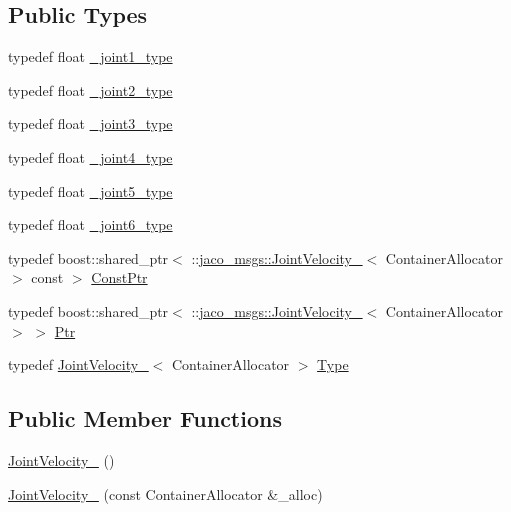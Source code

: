 \subsection*{Public Types}
\begin{DoxyCompactItemize}
\item 
typedef float \hyperlink{structjaco__msgs_1_1JointVelocity___ab6a0b6d8bf7015aff3a61c25b4bdf67b}{\+\_\+joint1\+\_\+type}
\item 
typedef float \hyperlink{structjaco__msgs_1_1JointVelocity___a60a2a12b126edac2c3004568aa77f833}{\+\_\+joint2\+\_\+type}
\item 
typedef float \hyperlink{structjaco__msgs_1_1JointVelocity___a516b16873309e426015d059948c9de5f}{\+\_\+joint3\+\_\+type}
\item 
typedef float \hyperlink{structjaco__msgs_1_1JointVelocity___a5433af2aa782711e694f2dea934d1e8a}{\+\_\+joint4\+\_\+type}
\item 
typedef float \hyperlink{structjaco__msgs_1_1JointVelocity___a994fb0216a13a4bac0b44d75b293c8d1}{\+\_\+joint5\+\_\+type}
\item 
typedef float \hyperlink{structjaco__msgs_1_1JointVelocity___aa08791b2618486b98789028edc8fecd7}{\+\_\+joint6\+\_\+type}
\item 
typedef boost\+::shared\+\_\+ptr$<$ \+::\hyperlink{structjaco__msgs_1_1JointVelocity__}{jaco\+\_\+msgs\+::\+Joint\+Velocity\+\_\+}$<$ Container\+Allocator $>$ const  $>$ \hyperlink{structjaco__msgs_1_1JointVelocity___a16e3f55bcdaff368c588945f63478858}{Const\+Ptr}
\item 
typedef boost\+::shared\+\_\+ptr$<$ \+::\hyperlink{structjaco__msgs_1_1JointVelocity__}{jaco\+\_\+msgs\+::\+Joint\+Velocity\+\_\+}$<$ Container\+Allocator $>$ $>$ \hyperlink{structjaco__msgs_1_1JointVelocity___abfcfdd60981037c03b85fd7ed2989df2}{Ptr}
\item 
typedef \hyperlink{structjaco__msgs_1_1JointVelocity__}{Joint\+Velocity\+\_\+}$<$ Container\+Allocator $>$ \hyperlink{structjaco__msgs_1_1JointVelocity___a09ae16ebc5eec5d6a7f20405ab791467}{Type}
\end{DoxyCompactItemize}
\subsection*{Public Member Functions}
\begin{DoxyCompactItemize}
\item 
\hyperlink{structjaco__msgs_1_1JointVelocity___a8ebfb46d45f3cebfd0d72869b043c571}{Joint\+Velocity\+\_\+} ()
\item 
\hyperlink{structjaco__msgs_1_1JointVelocity___a105ebf90fa802ef67761d8209dc1b45e}{Joint\+Velocity\+\_\+} (const Container\+Allocator \&\+\_\+alloc)
\end{DoxyCompactItemize}
